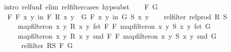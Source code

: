 \begin{isabellebody}
%
\isadelimproof
%
\endisadelimproof
%
\isatagproof
{}\isamarkupfalse%
{\isacharparenleft}{\kern0pt}intro\ rel{\isacharunderscore}{\kern0pt}funI{\isacharsemicolon}{\kern0pt}\ elim\ rel{\isacharunderscore}{\kern0pt}filter{\isachardot}{\kern0pt}cases{\isacharsemicolon}{\kern0pt}\ hypsubst{\isacharparenright}{\kern0pt}\isanewline
\ \ \isamarkupfalse%
\ F\ G\isanewline
\ \ \isamarkupfalse%
\ F{\isacharcolon}{\kern0pt}\ {\isachardoublequoteopen}{\isasymforall}\isactrlsub F\ {\isacharparenleft}{\kern0pt}x{\isacharcomma}{\kern0pt}\ y{\isacharparenright}{\kern0pt}\ in\ F{\isachardot}{\kern0pt}\ R\ x\ y{\isachardoublequoteclose}\ \ G{\isacharcolon}{\kern0pt}\ {\isachardoublequoteopen}{\isasymforall}\isactrlsub F\ {\isacharparenleft}{\kern0pt}x{\isacharcomma}{\kern0pt}\ y{\isacharparenright}{\kern0pt}\ in\ G{\isachardot}{\kern0pt}\ S\ x\ y{\isachardoublequoteclose}\isanewline
\ \ \isamarkupfalse%
\ {\isachardoublequoteopen}rel{\isacharunderscore}{\kern0pt}filter\ {\isacharparenleft}{\kern0pt}rel{\isacharunderscore}{\kern0pt}prod\ R\ S{\isacharparenright}{\kern0pt}\isanewline
\ \ \ \ {\isacharparenleft}{\kern0pt}map{\isacharunderscore}{\kern0pt}filter{\isacharunderscore}{\kern0pt}on\ {\isacharbraceleft}{\kern0pt}{\isacharparenleft}{\kern0pt}x{\isacharcomma}{\kern0pt}\ y{\isacharparenright}{\kern0pt}{\isachardot}{\kern0pt}\ R\ x\ y{\isacharbraceright}{\kern0pt}\ fst\ F\ {\isasymtimes}\isactrlsub F\ map{\isacharunderscore}{\kern0pt}filter{\isacharunderscore}{\kern0pt}on\ {\isacharbraceleft}{\kern0pt}{\isacharparenleft}{\kern0pt}x{\isacharcomma}{\kern0pt}\ y{\isacharparenright}{\kern0pt}{\isachardot}{\kern0pt}\ S\ x\ y{\isacharbraceright}{\kern0pt}\ fst\ G{\isacharparenright}{\kern0pt}\isanewline
\ \ \ \ {\isacharparenleft}{\kern0pt}map{\isacharunderscore}{\kern0pt}filter{\isacharunderscore}{\kern0pt}on\ {\isacharbraceleft}{\kern0pt}{\isacharparenleft}{\kern0pt}x{\isacharcomma}{\kern0pt}\ y{\isacharparenright}{\kern0pt}{\isachardot}{\kern0pt}\ R\ x\ y{\isacharbraceright}{\kern0pt}\ snd\ F\ {\isasymtimes}\isactrlsub F\ map{\isacharunderscore}{\kern0pt}filter{\isacharunderscore}{\kern0pt}on\ {\isacharbraceleft}{\kern0pt}{\isacharparenleft}{\kern0pt}x{\isacharcomma}{\kern0pt}\ y{\isacharparenright}{\kern0pt}{\isachardot}{\kern0pt}\ S\ x\ y{\isacharbraceright}{\kern0pt}\ snd\ G{\isacharparenright}{\kern0pt}{\isachardoublequoteclose}\isanewline
\ \ \ \ {\isacharparenleft}{\kern0pt}\ {\isachardoublequoteopen}rel{\isacharunderscore}{\kern0pt}filter\ {\isacharquery}{\kern0pt}RS\ {\isacharquery}{\kern0pt}F\ {\isacharquery}{\kern0pt}G{\isachardoublequoteclose}{\isacharparenright}{\kern0pt}\isanewline

\end{isabellebody}
